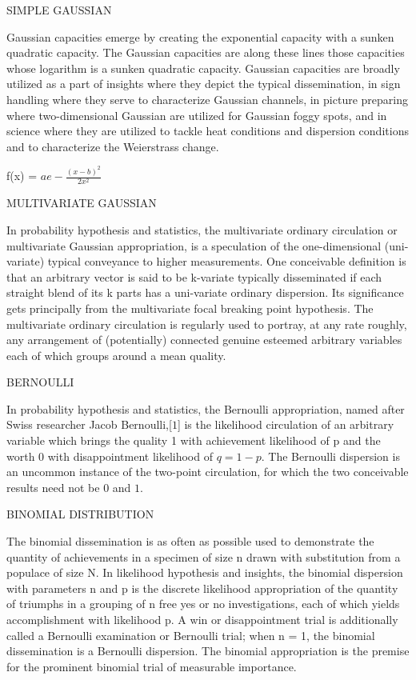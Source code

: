 \documentclass[11pt]{article}
\begin{document}
SIMPLE GAUSSIAN

Gaussian capacities emerge by creating the exponential capacity with a sunken quadratic capacity. The Gaussian capacities are along these lines those capacities whose logarithm is a sunken quadratic capacity. Gaussian capacities are broadly utilized as a part of insights where they depict the typical dissemination, in sign handling where they serve to characterize Gaussian channels, in picture preparing where two-dimensional Gaussian are utilized for Gaussian foggy spots, and in science where they are utilized to tackle heat conditions and dispersion conditions and to characterize the Weierstrass change.

f(x) = $ae-\frac{(x-b)^2}{2x^2}$


MULTIVARIATE GAUSSIAN

In probability hypothesis and statistics, the multivariate ordinary circulation or multivariate Gaussian appropriation, is a speculation of the one-dimensional (uni-variate) typical conveyance to higher measurements. One conceivable definition is that an arbitrary vector is said to be k-variate typically disseminated if each straight blend of its k parts has a uni-variate ordinary dispersion. Its significance gets principally from the multivariate focal breaking point hypothesis. The multivariate ordinary circulation is regularly used to portray, at any rate roughly, any arrangement of (potentially) connected genuine esteemed arbitrary variables each of which groups around a mean quality.

BERNOULLI

In probability hypothesis and statistics, the Bernoulli appropriation, named after Swiss researcher Jacob Bernoulli,[$1$] is the likelihood circulation of an arbitrary variable which brings the quality 1 with achievement likelihood of p and the worth 0 with disappointment likelihood of $q=1-p$. The Bernoulli dispersion is an uncommon instance of the two-point circulation, for which the two conceivable results need not be $0$ and $1$.

BINOMIAL DISTRIBUTION

The binomial dissemination is as often as possible used to demonstrate the quantity of achievements in a specimen of size n drawn with substitution from a populace of size N. In likelihood hypothesis and insights, the binomial dispersion with parameters n and p is the discrete likelihood appropriation of the quantity of triumphs in a grouping of n free yes or no investigations, each of which yields accomplishment with likelihood p. A win or disappointment trial is additionally called a Bernoulli examination or Bernoulli trial; when n = 1, the binomial dissemination is a Bernoulli dispersion. The binomial appropriation is the premise for the prominent binomial trial of measurable importance.
\end{document}
